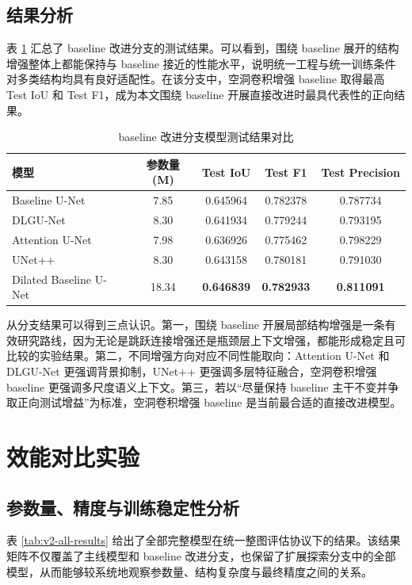 \subsection{结果分析}
表 \ref{tab:v2-baseline-branch} 汇总了 baseline 改进分支的测试结果。可以看到，围绕 baseline 展开的结构增强整体上都能保持与 baseline 接近的性能水平，说明统一工程与统一训练条件对多类结构均具有良好适配性。在该分支中，空洞卷积增强 baseline 取得最高 Test IoU 和 Test F1，成为本文围绕 baseline 开展直接改进时最具代表性的正向结果。

\begin{table}[htbp]
\centering
\caption{baseline 改进分支模型测试结果对比}
\label{tab:v2-baseline-branch}
\begin{tabular}{lcccc}
\toprule
模型 & 参数量(M) & Test IoU & Test F1 & Test Precision \\
\midrule
Baseline U-Net & 7.85 & 0.645964 & 0.782378 & 0.787734 \\
DLGU-Net & 8.30 & 0.641934 & 0.779244 & 0.793195 \\
Attention U-Net & 7.98 & 0.636926 & 0.775462 & 0.798229 \\
UNet++ & 8.30 & 0.643158 & 0.780181 & 0.791030 \\
Dilated Baseline U-Net & 18.34 & \textbf{0.646839} & \textbf{0.782933} & \textbf{0.811091} \\
\bottomrule
\end{tabular}
\end{table}

从分支结果可以得到三点认识。第一，围绕 baseline 开展局部结构增强是一条有效研究路线，因为无论是跳跃连接增强还是瓶颈层上下文增强，都能形成稳定且可比较的实验结果。第二，不同增强方向对应不同性能取向：Attention U-Net 和 DLGU-Net 更强调背景抑制，UNet++ 更强调多层特征融合，空洞卷积增强 baseline 更强调多尺度语义上下文。第三，若以“尽量保持 baseline 主干不变并争取正向测试增益”为标准，空洞卷积增强 baseline 是当前最合适的直接改进模型。

\section{效能对比实验}
\subsection{参数量、精度与训练稳定性分析}
表 \ref{tab:v2-all-results} 给出了全部完整模型在统一整图评估协议下的结果。该结果矩阵不仅覆盖了主线模型和 baseline 改进分支，也保留了扩展探索分支中的全部模型，从而能够较系统地观察参数量、结构复杂度与最终精度之间的关系。

